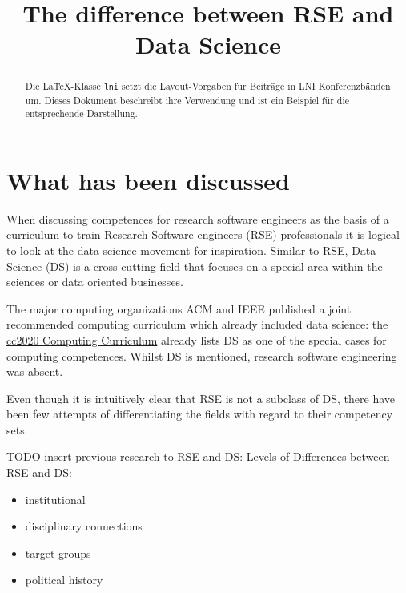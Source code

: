 \documentclass[
        english,biblatex
    ]{lni}
\providecommand{\tightlist}{%
    \setlength{\itemsep}{0pt}\setlength{\parskip}{0pt}}
\begin{document}
        \title[]{The difference between RSE and Data Science}
    
    
    

    \maketitle

        \begin{abstract}
        Die LaTeX-Klasse \texttt{lni} setzt die Layout-Vorgaben für
        Beiträge in LNI Konferenzbänden um. Dieses Dokument beschreibt
        ihre Verwendung und ist ein Beispiel für die entsprechende
        Darstellung.
    \end{abstract}
    
    
    \section{What has been discussed}\label{what-has-been-discussed}

    When discussing competences for research software engineers as the
    basis of a curriculum to train Research Software engineers (RSE)
    professionals it is logical to look at the data science movement for
    inspiration. Similar to RSE, Data Science (DS) is a cross-cutting
    field that focuses on a special area within the sciences or data
    oriented businesses.

    The major computing organizations ACM and IEEE published a joint
    recommended computing curriculum which already included data
    science: the
    \href{https://www.acm.org/binaries/content/assets/education/curricula-recommendations/cc2020.pdf}{cc2020
    Computing Curriculum} already lists DS as one of the special cases
    for computing competences. Whilst DS is mentioned, research software
    engineering was absent.

    Even though it is intuitively clear that RSE is not a subclass of
    DS, there have been few attempts of differentiating the fields with
    regard to their competency sets.

    TODO insert previous research to RSE and DS: Levels of Differences
    between RSE and DS:

    \begin{itemize}
    \tightlist
    \item
      institutional
    \item
      disciplinary connections
    \item
      target groups
    \item
      political history
    \end{itemize}
\end{document}
